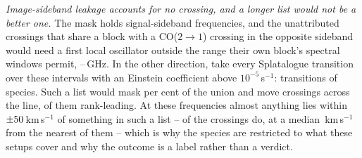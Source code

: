 \emph{Image-sideband leakage accounts for no crossing, and a longer list
would not be a better one.} The mask holds signal-sideband frequencies, and
the \MkImgN{} unattributed crossings that share a block with a CO($2\to1$)
crossing in the opposite sideband would need a first local oscillator outside
the range their own block's spectral windows permit,
\MkImgLOLo--\MkImgLOHi\,GHz. In the other direction, take every Splatalogue
transition over these intervals with an Einstein coefficient above
$10^{-5}$\,s$^{-1}$: \MaskDbTrans{} transitions of \MaskDbCarriers{}
species. Such a list would mask \MaskDbPctUnion{} per cent of the union and
move \FrFullNFlip{} crossings across the line, \FrFullNFlipRankWord{} of them
rank-leading. At these frequencies almost anything lies within
$\pm50$\,km\,s$^{-1}$ of something in such a list --
\TnNNearDb{} of the \NCross{} crossings do, at a median
\TnMedDbKms\,km\,s$^{-1}$ from the nearest of them -- which is why the
species are restricted to what these setups cover and why the outcome is a
label rather than a verdict.
